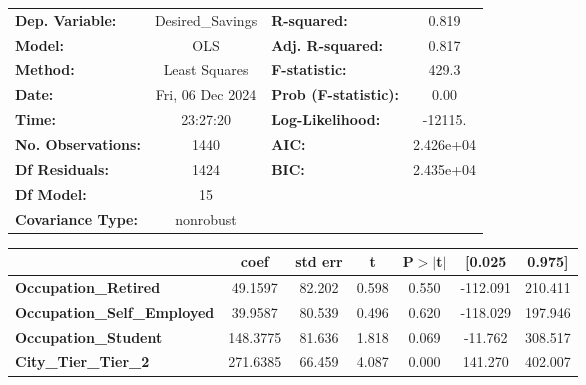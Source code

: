 \documentclass[12pt]{article}
\begin{document}
\begin{center}
    \begin{tabular}{lclc}
    \toprule
    \textbf{Dep. Variable:}                    & Desired\_Savings & \textbf{  R-squared:         } &     0.819   \\
    \textbf{Model:}                            &       OLS        & \textbf{  Adj. R-squared:    } &     0.817   \\
    \textbf{Method:}                           &  Least Squares   & \textbf{  F-statistic:       } &     429.3   \\
    \textbf{Date:}                             & Fri, 06 Dec 2024 & \textbf{  Prob (F-statistic):} &     0.00    \\
    \textbf{Time:}                             &     23:27:20     & \textbf{  Log-Likelihood:    } &   -12115.   \\
    \textbf{No. Observations:}                 &        1440      & \textbf{  AIC:               } & 2.426e+04   \\
    \textbf{Df Residuals:}                     &        1424      & \textbf{  BIC:               } & 2.435e+04   \\
    \textbf{Df Model:}                         &          15      & \textbf{                     } &             \\
    \textbf{Covariance Type:}                  &    nonrobust     & \textbf{                     } &             \\
    \bottomrule
    \end{tabular}
    \begin{tabular}{lcccccc}
                                               & \textbf{coef} & \textbf{std err} & \textbf{t} & \textbf{P$> |$t$|$} & \textbf{[0.025} & \textbf{0.975]}  \\
    \midrule
    \textbf{Occupation\_Retired}               &      49.1597  &       82.202     &     0.598  &         0.550        &     -112.091    &      210.411     \\
    \textbf{Occupation\_Self\_Employed}        &      39.9587  &       80.539     &     0.496  &         0.620        &     -118.029    &      197.946     \\
    \textbf{Occupation\_Student}               &     148.3775  &       81.636     &     1.818  &         0.069        &      -11.762    &      308.517     \\
    \textbf{City\_Tier\_Tier\_2}               &     271.6385  &       66.459     &     4.087  &         0.000        &      141.270    &      402.007     \\

\end{tabular}
\end{center}
\end{document}
